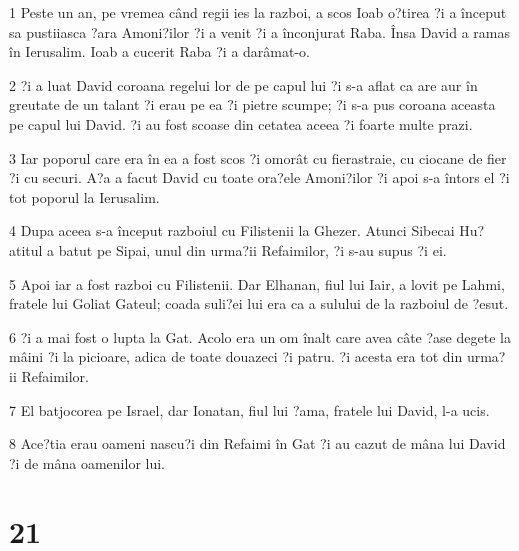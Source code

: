 \par 1 Peste un an, pe vremea când regii ies la razboi, a scos Ioab o?tirea ?i a început sa pustiiasca ?ara Amoni?ilor ?i a venit ?i a înconjurat Raba. Însa David a ramas în Ierusalim. Ioab a cucerit Raba ?i a darâmat-o.
\par 2 ?i a luat David coroana regelui lor de pe capul lui ?i s-a aflat ca are aur în greutate de un talant ?i erau pe ea ?i pietre scumpe; ?i s-a pus coroana aceasta pe capul lui David. ?i au fost scoase din cetatea aceea ?i foarte multe prazi.
\par 3 Iar poporul care era în ea a fost scos ?i omorât cu fierastraie, cu ciocane de fier ?i cu securi. A?a a facut David cu toate ora?ele Amoni?ilor ?i apoi s-a întors el ?i tot poporul la Ierusalim.
\par 4 Dupa aceea s-a început razboiul cu Filistenii la Ghezer. Atunci Sibecai Hu?atitul a batut pe Sipai, unul din urma?ii Refaimilor, ?i s-au supus ?i ei.
\par 5 Apoi iar a fost razboi cu Filistenii. Dar Elhanan, fiul lui Iair, a lovit pe Lahmi, fratele lui Goliat Gateul; coada suli?ei lui era ca a sulului de la razboiul de ?esut.
\par 6 ?i a mai fost o lupta la Gat. Acolo era un om înalt care avea câte ?ase degete la mâini ?i la picioare, adica de toate douazeci ?i patru. ?i acesta era tot din urma?ii Refaimilor.
\par 7 El batjocorea pe Israel, dar Ionatan, fiul lui ?ama, fratele lui David, l-a ucis.
\par 8 Ace?tia erau oameni nascu?i din Refaimi în Gat ?i au cazut de mâna lui David ?i de mâna oamenilor lui.

\chapter{21}

